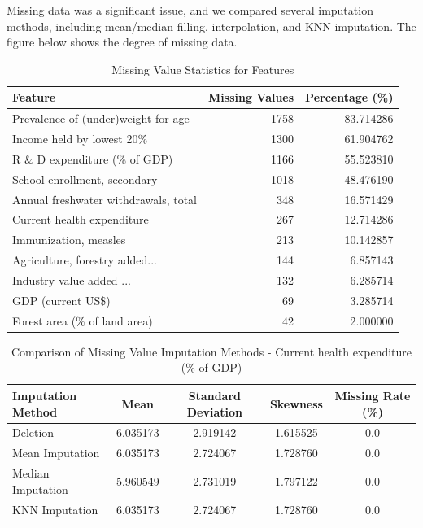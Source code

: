 \documentclass{article}
\begin{document}
Missing data was a significant issue, and we compared several imputation methods, including mean/median filling, interpolation, 
and KNN imputation.
The figure below shows the degree of missing data. 
\begin{table}[h]
    \centering
    \caption{Missing Value Statistics for Features}
    \label{tab:missing_values}
    \begin{tabularx}{\columnwidth}{|>{\raggedright\arraybackslash}X|r|r|} %
        \hline
        \textbf{Feature} & \textbf{Missing Values} & \textbf{Percentage (\%)} \\
        \hline
        Prevalence of (under)weight for age & 1758 & 83.714286 \\
        Income held by lowest 20\% & 1300 & 61.904762 \\
        R \& D expenditure (\% of GDP) & 1166 & 55.523810 \\
        School enrollment, secondary  & 1018 & 48.476190 \\
        Annual freshwater withdrawals, total  & 348 & 16.571429 \\
        Current health expenditure  & 267 & 12.714286 \\
        Immunization, measles  & 213 & 10.142857 \\
        Agriculture, forestry added... & 144 & 6.857143 \\
        Industry value added ... & 132 & 6.285714 \\
        GDP (current US\$) & 69 & 3.285714 \\
        Forest area (\% of land area) & 42 & 2.000000 \\
        \hline
    \end{tabularx} %
\end{table}

\begin{table}[h]
    \centering
    \fontsize{5pt}{10pt}
    \caption{Comparison of Missing Value Imputation Methods - Current health expenditure (\% of GDP)}
    \label{tab:imputation_comparison_health_exp}
    \begin{tabular}{|l|c|c|c|c|}
        \hline
        \textbf{Imputation Method} & \textbf{Mean} & \textbf{Standard Deviation} & \textbf{Skewness} & \textbf{Missing Rate (\%)} \\
        \hline
        Deletion & 6.035173 & 2.919142 & 1.615525 & 0.0 \\
        Mean Imputation & 6.035173 & 2.724067 & 1.728760 & 0.0 \\
        Median Imputation & 5.960549 & 2.731019 & 1.797122 & 0.0 \\
        KNN Imputation & 6.035173 & 2.724067 & 1.728760 & 0.0 \\
        \hline
    \end{tabular}
\end{table}
\end{document}

